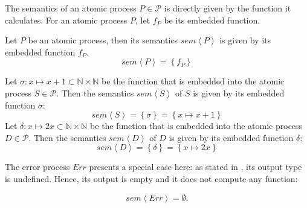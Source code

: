 The semantics of an atomic process $P \in \mathcal{P}$ is directly given by the function it calculates. For an atomic process $P$, let $f_P$ be its embedded function.
\begin{definition}
  \label{def:sem_atomic}
  Let $P$ be an atomic process, then its semantics $sem \left\langle P \right\rangle$ is given by its embedded function $f_P$.
  \begin{equation}
    \label{eqn:sem_atomic}
    sem \left\langle P \right\rangle = \left\{ f_P \right\}
  \end{equation}
  \hfill\qedsymbol
\end{definition}

\begin{example}
  \label{exp:sem_atomic}
  Let $\sigma \colon x \mapsto x+1 \subset \mathbb{N} \times \mathbb{N}$ be the function that is embedded into the atomic process $S \in \mathcal{P}$. Then the semantics $sem \left\langle S \right\rangle$ of $S$ is given by its embedded function $\sigma$:
  \begin{equation}
    sem \left\langle S \right\rangle = \left\{ \sigma \right\} = \left\{ x \mapsto x+1 \right\}
  \end{equation}
  Let $\delta \colon x \mapsto 2x \subset \mathbb{N} \times \mathbb{N}$ be the function that is embedded into the atomic process $D \in \mathcal{P}$. Then the semantics $sem \left\langle D \right\rangle$ of $D$ is given by its embedded function $\delta$:
  \begin{equation}
    sem \left\langle D \right\rangle = \left\{ \delta \right\} = \left\{ x \mapsto 2x \right\}
  \end{equation}
  \hfill\qedsymbol
\end{example}

The error process $Err$ presents a special case here: as stated in , its output type is undefined. Hence, its output is empty and it does not compute any function:
\begin{definition}
  \begin{equation}
    \label{eqn:sem_error}
    sem \left\langle Err \right\rangle = \emptyset.
  \end{equation}
  \hfill\qedsymbol
\end{definition}


